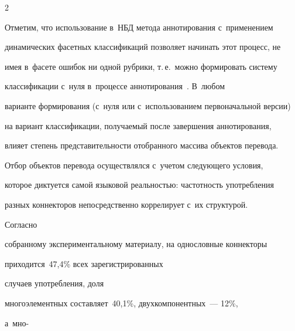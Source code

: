 \begin{multicols}{2}
  


  Отметим, что использование в~НБД метода аннотирования с~применением 


динамических фасетных классификаций позволяет начинать этот процесс, не 


имея в~фасете ошибок ни одной рубрики, т.\,е.\ можно формировать систему 


классификации с~нуля в~процессе аннотирования~\cite{22-gz}. В~любом\linebreak 


варианте формирования (с~нуля или с~исполь\-зо\-ванием первоначальной версии) 


на вариант клас\-сификации, получаемый после завершения ан\-нотирования, 


влияет степень представительности отобранного массива объектов перевода.


  


  Отбор объектов перевода осуществлялся с~учетом следующего условия, 


которое диктуется самой языковой реальностью: частотность употребления 


разных коннекторов непосредственно коррелирует с~их структурой. 


Согласно 


собранному экспериментальному материалу, на однословные коннекторы 


приходится~47,4\% всех зарегистрированных


случаев употребления, доля 


многоэлементных составляет~40,1\%, двухкомпонентных~--- 12\%, 


а~мно-\linebreak\vspace*{-12pt}





\end{multicols}





